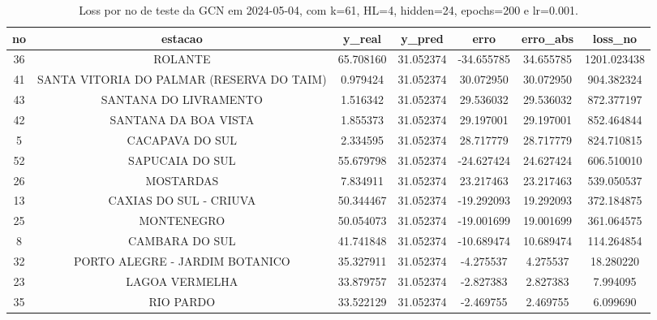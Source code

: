 \begin{table}[h]
\centering
\caption{Loss por no de teste da GCN em 2024-05-04, com k=61, HL=4, hidden=24, epochs=200 e lr=0.001.}
\label{tab:gcn_loss_k61_hl4_h24_e200_d20240504}
\begin{tabular}{ccccccc}
\toprule
no & estacao & y\_real & y\_pred & erro & erro\_abs & loss\_no \\
\midrule
36 & ROLANTE & 65.708160 & 31.052374 & -34.655785 & 34.655785 & 1201.023438 \\
41 & SANTA VITORIA DO PALMAR (RESERVA DO TAIM) & 0.979424 & 31.052374 & 30.072950 & 30.072950 & 904.382324 \\
43 & SANTANA DO LIVRAMENTO & 1.516342 & 31.052374 & 29.536032 & 29.536032 & 872.377197 \\
42 & SANTANA DA BOA VISTA & 1.855373 & 31.052374 & 29.197001 & 29.197001 & 852.464844 \\
5 & CACAPAVA DO SUL & 2.334595 & 31.052374 & 28.717779 & 28.717779 & 824.710815 \\
52 & SAPUCAIA DO SUL & 55.679798 & 31.052374 & -24.627424 & 24.627424 & 606.510010 \\
26 & MOSTARDAS & 7.834911 & 31.052374 & 23.217463 & 23.217463 & 539.050537 \\
13 & CAXIAS DO SUL - CRIUVA & 50.344467 & 31.052374 & -19.292093 & 19.292093 & 372.184875 \\
25 & MONTENEGRO & 50.054073 & 31.052374 & -19.001699 & 19.001699 & 361.064575 \\
8 & CAMBARA DO SUL & 41.741848 & 31.052374 & -10.689474 & 10.689474 & 114.264854 \\
32 & PORTO ALEGRE - JARDIM BOTANICO & 35.327911 & 31.052374 & -4.275537 & 4.275537 & 18.280220 \\
23 & LAGOA VERMELHA & 33.879757 & 31.052374 & -2.827383 & 2.827383 & 7.994095 \\
35 & RIO PARDO & 33.522129 & 31.052374 & -2.469755 & 2.469755 & 6.099690 \\
\bottomrule
\end{tabular}
\end{table}
